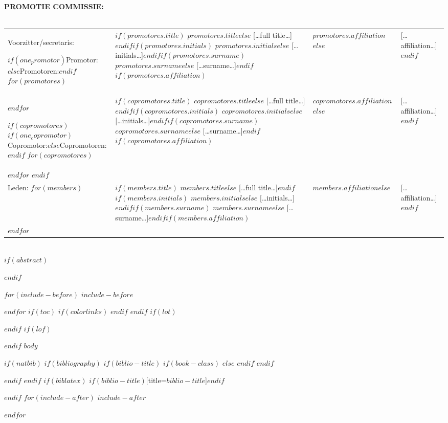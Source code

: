 \documentclass[$if(fontsize)$$fontsize$,$endif$$if(lang)$$babel-lang$,$endif$$if(papersize)$$papersize$paper,twoside,$endif$$for(classoption)$$classoption$$sep$,$endfor$]{$documentclass$} %
\begin{document}
\clearpage
\thispagestyle{empty}
\noindent\textbf{PROMOTIE COMMISSIE:}\\
\\
\noindent\begin{tabular}{@{}lll}
Voorzitter/secretaris: 

$if(one_promotor)$Promotor:$else$Promotoren:$endif$
$for(promotores)$
& $if(promotores.title)$ $promotores.title$$else$ […full title…]$endif$$if(promotores.initials)$ $promotores.initials$$else$ […initials…]$endif$$if(promotores.surname)$ $promotores.surname$$else$ […surname…]$endif$$if(promotores.affiliation)$ & $promotores.affiliation$$else$ & […affiliation…]$endif$\\
$endfor$

$if(copromotores)$
$if(one_copromotor)$Copromotor:$else$Copromotoren:$endif$
$for(copromotores)$
& $if(copromotores.title)$ $copromotores.title$$else$ […full title…]$endif$$if(copromotores.initials)$ $copromotores.initials$$else$ […initials…]$endif$$if(copromotores.surname)$ $copromotores.surname$$else$ […surname…]$endif$$if(copromotores.affiliation)$ & $copromotores.affiliation$$else$ & […affiliation…]$endif$\\
$endfor$
$endif$

\\
Leden:
$for(members)$
& $if(members.title)$ $members.title$$else$ […full title…]$endif$$if(members.initials)$ $members.initials$$else$ […initials…]$endif$$if(members.surname)$ $members.surname$$else$ […surname…]$endif$$if(members.affiliation)$ & $members.affiliation$$else$ & […affiliation…]$endif$\\
$endfor$
\end{tabular}\\



$if(abstract)$
\begin{abstract}
$abstract$
\end{abstract}
$endif$

$for(include-before)$
$include-before$

$endfor$
$if(toc)$
{
$if(colorlinks)$
\hypersetup{linkcolor=$if(toccolor)$$toccolor$$else$black$endif$}
$endif$
\setcounter{tocdepth}{$toc-depth$}
\tableofcontents
}
$endif$
$if(lot)$
\listoftables
$endif$
$if(lof)$
\listoffigures
$endif$
\mainmatter
$body$

\backmatter
$if(natbib)$
$if(bibliography)$
$if(biblio-title)$
$if(book-class)$
\renewcommand\bibname{$biblio-title$}
$else$
\renewcommand\refname{$biblio-title$}
$endif$
$endif$


$endif$
$endif$
$if(biblatex)$
\printbibliography$if(biblio-title)$[title=$biblio-title$]$endif$

$endif$
$for(include-after)$
$include-after$

$endfor$
\end{document}

